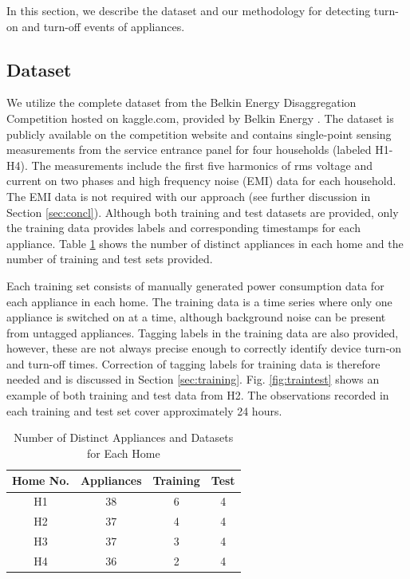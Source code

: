\documentclass[conference]{IEEEtran}
\begin{document}
In this section, we describe the dataset and our methodology for detecting turn-on and turn-off events of appliances. 

\subsection{Dataset}
We utilize the complete dataset from the Belkin Energy Disaggregation Competition hosted on kaggle.com, provided by Belkin Energy \cite{Kaggle}.  The dataset is publicly available on the competition website and contains single-point sensing measurements from the service entrance panel for four households (labeled H1-H4).  The measurements include the first five harmonics of rms voltage and current on two phases and high frequency noise (EMI) data for each household.  The EMI data is not required with our approach (see further discussion in Section \ref{sec:concl}).  Although both training and test datasets are provided, only the training data provides labels and corresponding timestamps for each appliance. Table \ref{table:dataset} shows the number of distinct appliances in each home and the number of training and test sets provided. 

Each training set consists of manually generated power consumption data for each appliance in each home.  The training data is a time series where only one appliance is switched on at a time, although background noise can be present from untagged appliances. Tagging labels in the training data are also provided, however, these are not always precise enough to correctly identify device turn-on and turn-off times. Correction of tagging labels for training data is therefore needed and is discussed in Section \ref{sec:training}.  Fig. \ref{fig:traintest} shows an example of both training and test data from H2.  The observations recorded in each training and test set cover approximately 24 hours.  

\begin{table}[!t]
	\renewcommand{\arraystretch}{1.3}
	\caption{Number of Distinct Appliances and Datasets for Each Home}\label{classes}
	\label{table:dataset}
	\centering
	\begin{tabular}{c||c||c||c}
		\hline 
		\textbf{Home No.} & \textbf{Appliances} &\textbf{Training} &\textbf{Test}\tabularnewline
		\hline 
		\hline 
		H1 & 38 & 6 & 4\tabularnewline
		\hline 
		H2 & 37 & 4 & 4\tabularnewline
		\hline 
		H3 & 37 & 3 & 4\tabularnewline
		\hline 
		H4 & 36 & 2 & 4\tabularnewline
		\hline 
	\end{tabular}
\end{table}
\end{document}
